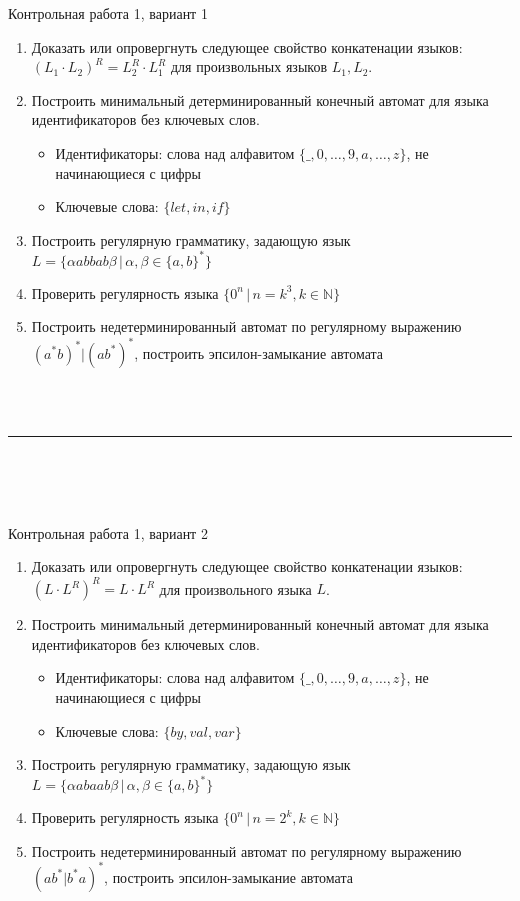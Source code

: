\documentclass[12pt]{article}
\begin{document}

{\Large Контрольная работа 1, вариант 1}
\bigskip

\begin{enumerate}
  \item Доказать или опровергнуть следующее свойство конкатенации языков: $( L_1 \cdot L_2 )^R = L_2^R \cdot L_1^R $ для произвольных языков $L_1, L_2$.
  \item Построить минимальный детерминированный конечный автомат для языка идентификаторов без ключевых слов.
  \begin{itemize}
      \item Идентификаторы: слова над алфавитом $\{\_, 0, \dots, 9, a, \dots, z \}$, не начинающиеся с цифры
      \item Ключевые слова: $\{ let, in, if \}$
  \end{itemize}
  \item Построить регулярную грамматику, задающую язык $ L = \{ \alpha a b b a b \beta \, | \, \alpha, \beta \in \{ a, b \}^* \} $
  \item Проверить регулярность языка $\{ 0^n \, | \, n = k^3, k \in \mathbb{N}\} $
  \item {Построить недетерминированный автомат по регулярному выражению $ (a^*b)^*|(ab^*)^*  $, построить эпсилон-замыкание автомата }
\end{enumerate}

\bigskip

~\\~

\bigskip

\rule{\textwidth}{1pt}

\bigskip

~\\~\\~

\bigskip


{\Large Контрольная работа 1, вариант 2}
\bigskip

\begin{enumerate}
  \item Доказать или опровергнуть следующее свойство конкатенации языков: $ (L \cdot L^R)^R = L \cdot L^R $ для произвольного языка $L$.
  \item Построить минимальный детерминированный конечный автомат для языка идентификаторов без ключевых слов.
  \begin{itemize}
      \item Идентификаторы: слова над алфавитом $\{\_, 0, \dots, 9, a, \dots, z \}$, не начинающиеся с цифры
      \item Ключевые слова: $\{ by, val, var \}$
  \end{itemize}
  \item Построить регулярную грамматику, задающую язык $ L = \{ \alpha a b a a b \beta \, | \, \alpha, \beta \in \{ a, b \}^* \} $
  \item Проверить регулярность языка $\{ 0^n \, | \, n = 2^k, k \in \mathbb{N}\} $
  \item {Построить недетерминированный автомат по регулярному выражению $ (ab^* | b^*a)^*  $, построить эпсилон-замыкание автомата }
\end{enumerate}
\end{document}

